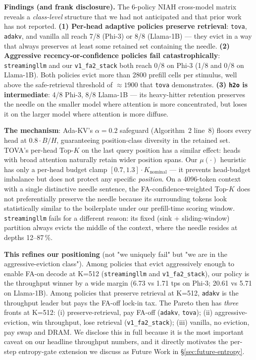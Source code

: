 \documentclass[sigconf, anonymous=false, screen=true]{acmart}
\begin{document}
\textbf{Findings (and frank disclosure).} The 6-policy NIAH cross-model matrix reveals a \emph{class-level} structure that we had not anticipated and that prior work has not reported. \textbf{(1) Per-head adaptive policies preserve retrieval}: \texttt{tova}, \texttt{adakv}, and vanilla all reach 7/8 (Phi-3) or 8/8 (Llama-1B) — they evict in a way that always preserves at least some retained set containing the needle. \textbf{(2) Aggressive recency-or-confidence policies fail catastrophically}: \texttt{streamingllm} and our \texttt{v1\_fa2\_stack} both reach 0/8 on Phi-3 (1/8 and 0/8 on Llama-1B). Both policies evict more than 2800 prefill cells per stimulus, well above the safe-retrieval threshold of $\approx 1900$ that \texttt{tova} demonstrates. \textbf{(3) \texttt{h2o} is intermediate}: 4/8 Phi-3, 8/8 Llama-1B — its heavy-hitter retention preserves the needle on the smaller model where attention is more concentrated, but loses it on the larger model where attention is more diffuse.

\textbf{The mechanism}: Ada-KV's $\alpha{=}0.2$ safeguard (Algorithm~2 line~8) floors every head at $0.8 \cdot B/H$, guaranteeing position-class diversity in the retained set. TOVA's per-head Top-$K$ on the last query position has a similar effect: heads with broad attention naturally retain wider position spans. Our $\mu(\cdot)$ heuristic has only a per-head budget clamp $[0.7, 1.3] \cdot K_{\text{nominal}}$ — it prevents head-budget imbalance but does not protect any specific \emph{position}. On a 4096-token context with a single distinctive needle sentence, the FA-confidence-weighted Top-$K$ does not preferentially preserve the needle because its surrounding tokens look statistically similar to the boilerplate under our prefill-time scoring window. \texttt{streamingllm} fails for a different reason: its fixed (sink + sliding-window) partition always evicts the middle of the context, where the needle resides at depths 12--87\,\%.

\textbf{This refines our positioning} (not "we uniquely fail" but "we are in the aggressive-eviction class"). Among policies that evict aggressively enough to enable FA-on decode at K=512 (\texttt{streamingllm} and \texttt{v1\_fa2\_stack}), our policy is the throughput winner by a wide margin (6.73 vs 1.71 tps on Phi-3; 20.61 vs 5.71 on Llama-1B). Among policies that preserve retrieval at K=512, \texttt{adakv} is the throughput leader but pays the FA-off lock-in tax. The Pareto then has \emph{three} fronts at K=512: (i) preserve-retrieval, pay FA-off (\texttt{adakv}, \texttt{tova}); (ii) aggressive-eviction, win throughput, lose retrieval (\texttt{v1\_fa2\_stack}); (iii) vanilla, no eviction, pay swap and DRAM. We disclose this in full because it is the most important caveat on our headline throughput numbers, and it directly motivates the per-step entropy-gate extension we discuss as Future Work in \S\ref{sec:future-entropy}.
\end{document}
